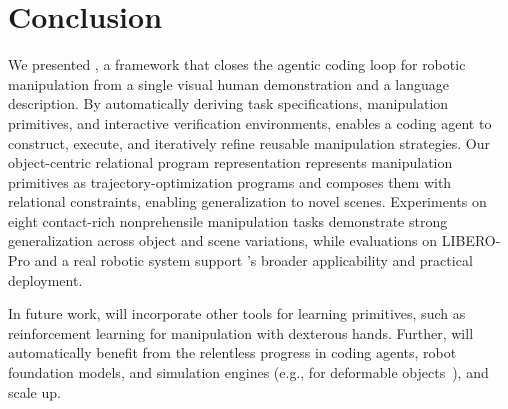 \section{Conclusion}
We presented \ours, a framework that closes the agentic coding loop for robotic manipulation from a single visual human demonstration and a language description. By automatically deriving task specifications, manipulation primitives, and interactive verification environments, \ours enables a coding agent to construct, execute, and iteratively refine reusable manipulation strategies. Our object-centric relational program representation represents manipulation primitives as trajectory-optimization programs and composes them with relational constraints, enabling generalization to novel scenes. Experiments on eight contact-rich nonprehensile manipulation tasks demonstrate strong generalization across object and scene variations, while evaluations on LIBERO-Pro and a real robotic system support \ours's broader applicability and practical deployment.


In future work, \ours will incorporate other tools for learning primitives, such as reinforcement learning for manipulation with dexterous hands. Further, \ours will automatically benefit from the relentless progress in coding agents, robot foundation models, and simulation engines (e.g., for deformable objects~\cite{newton}), and scale up.